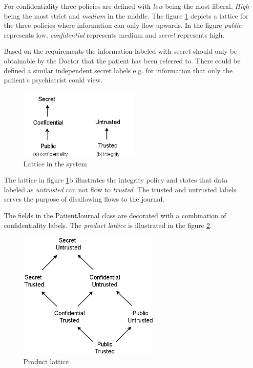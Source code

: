 For confidentiality three policies are defined with \emph{low} being the most liberal, \emph{High} being the most strict and \emph{medium} in the middle. The figure \ref{fig:lattice_confidentiality} depicts a lattice for the three policies where information can only flow upwards. In the figure \emph{public} represents low, \emph{confidential} represents medium and \emph{secret} represents high. 

Based on the requirements the information labeled with secret should only be obtainable by the Doctor that the patient has been referred to. There could be defined a similar independent secret labels e.g. for information that only the patient's psychiatrist could view.  


\begin{figure}[H] 
	\centering
	\includegraphics[width=6cm]{figures/lattice_confidentiality.png}
	\caption{Lattice in the system}
	\label{fig:lattice_confidentiality}
\end{figure}

The lattice in figure \ref{fig:lattice_confidentiality}b illustrates the integrity policy and states that data labeled as \emph{untrusted} can not flow to \emph{trusted}. The trusted and untrusted labels serves the purpose of disallowing flows to the journal.

The fields in the PatientJournal class are decorated with a combination of confidentiality labels. The \emph{product lattice} is illustrated in the figure \ref{fig:lattice_product}.

\begin{figure}[H] 
	\centering
	\includegraphics[width=7cm]{figures/lattice_product.png}
	\caption{Product lattice}
	\label{fig:lattice_product}
\end{figure}


